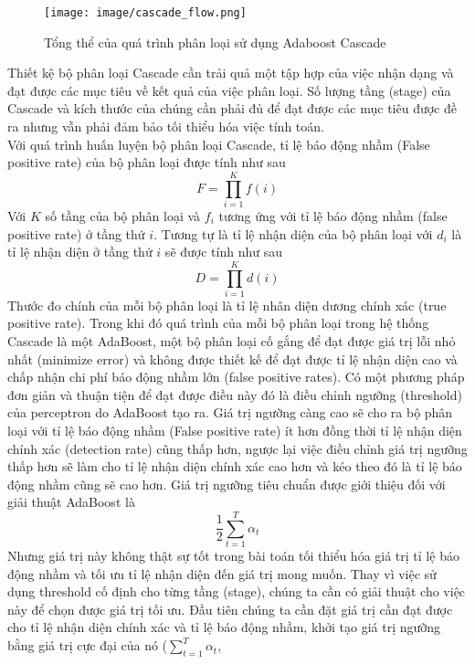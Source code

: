 \documentclass[12pt,a4paper]{article}
\begin{document}
                \begin{figure}[H]
                    \centering
                    \texttt{[image: image/cascade\_flow.png]}
                    \caption{Tổng thể của quá trình phân loại sử dụng Adaboost Cascade}
                    \label{fig:ada_cascade}
                \end{figure}
Thiết kệ bộ phân loại Cascade cần trải quả một tập hợp của việc nhận dạng và đạt được các mục tiêu về kết quả của việc phân loại. Số lượng tầng (stage) của Cascade và kích thước của chúng cần phải đủ để đạt được các mục tiêu được đề ra nhưng vẫn phải đảm bảo tối thiểu hóa việc tính toán. \\
Với quá trình huấn luyện bộ phân loại Cascade, tỉ lệ báo động nhầm (False positive rate) của bộ phân loại được tính như sau
\begin{equation}
    F = \prod_{i=1}^{K} f(i)
\end{equation}
Với $K$ số tầng của bộ phân loại và $f_i$ tương ứng với tỉ lệ báo động nhầm (false positive rate) ở tầng thứ $i$. Tương tự là tỉ lệ nhận diện của bộ phân loại với $d_i$ là tỉ lệ nhận diện ở tầng thứ $i$ sẽ được tính như sau
\begin{equation}
    D = \prod_{i=1}^{K} d(i)
\end{equation}
Thước đo chính của mỗi bộ phân loại là tỉ lệ nhân diện dương chính xác (true positive rate). Trong khi đó quá trình của mỗi bộ phân loại trong hệ thống Cascade là một AdaBoost, một bộ phân loại cố gắng để đạt được giá trị lỗi nhỏ nhất (minimize error) và không được thiết kế để đạt được tỉ lệ nhận diện cao và chấp nhận chi phí báo động nhầm lớn (false positive rates). Có một phương pháp đơn giản và thuận tiện để đạt được điều này đó là điều chỉnh ngưỡng (threshold) của perceptron do AdaBoost tạo ra. Giá trị ngưỡng càng cao sẽ cho ra bộ phân loại với tỉ lệ báo động nhầm (False positive rate) ít hơn đồng thời tỉ lệ nhận diện chính xác (detection rate) cũng thấp hơn, ngược lại việc điều chỉnh giá trị ngưỡng thấp hơn sẽ làm cho tỉ lệ nhận diện chính xác cao hơn và kéo theo đó là tỉ lệ báo động nhầm cũng sẽ cao hơn.
Giá trị ngưỡng tiêu chuẩn được giới thiệu đối với giải thuật AdaBoost là
\begin{equation}
\frac{1}{2} \sum_{t=1}^{T}\alpha_t
\end{equation}
Nhưng giá trị này không thật sự tốt trong bài toán tối thiểu hóa giá trị tỉ lệ báo động nhầm và tối ưu tỉ lệ nhận diện đến giá trị mong muốn. Thay vì việc sử dụng threshold cố định cho từng tầng (stage), chúng ta cần có giải thuật cho việc này để chọn được giá trị tối ưu. Đầu tiên chúng ta cần đặt giá trị cần đạt được cho tỉ lệ nhận diện chính xác và tỉ lệ báo động nhầm, khởi tạo giá trị ngưỡng bằng giá trị cực đại của nó ($ \sum_{t=1}^{T}\alpha_t $,
\end{document}
